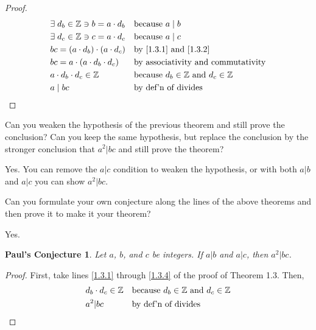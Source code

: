 \documentclass[../main.tex]{subfiles}
\begin{document}
\begin{proof}
\begin{align}
    \label{1.3.1}
    &\exists \; d_b \in \mathbb{Z} \ni b = a \cdot d_b && \mbox{because } a \mid b \\
    \label{1.3.2}
    &\exists \; d_c \in \mathbb{Z} \ni c = a \cdot d_c && \mbox{because } a \mid c \\
    &bc = (a \cdot d_b) \cdot (a \cdot d_c) && \mbox{by \eqref{1.3.1} and \eqref{1.3.2}} \\
    \label{1.3.4}
    &bc = a \cdot (a \cdot d_b \cdot d_c) && \mbox{by associativity and commutativity} \\
    &a \cdot d_b \cdot d_c \in \mathbb{Z} && \mbox{because } d_b \in \mathbb{Z} \mbox{ and } d_c \in \mathbb{Z} \\
    &a \mid bc && \mbox{by def'n of divides} \qedhere
\end{align}
\end{proof}



\begin{ques} \label{1.4}
    Can you weaken the hypothesis of the previous theorem and still prove the conclusion? Can you keep the same hypothesis, but replace the conclusion by the stronger conclusion that $a^2 | bc$ and still prove the theorem?
\end{ques}

Yes. You can remove the $a | c$ condition to weaken the hypothesis, or with both $a | b$ and $a | c$ you can show $a^2 | bc$.



\pagebreak



\begin{ques} \label{1.5}
Can you formulate your own conjecture along the lines of the above theorems and then prove it to make it your theorem?
\end{ques}

Yes.
\newtheorem*{PC}{Paul's Conjecture}
\begin{PC}
Let $a$, $b$, and $c$ be integers. If $a|b$ and $a|c$, then $a^2|bc$.
\end{PC}

\begin{proof}
First, take lines \eqref{1.3.1} through \eqref{1.3.4} of the proof of Theorem 1.3. Then,
\begin{align*}
    &d_b \cdot d_c \in \mathbb{Z} && \mbox{because } d_b \in \mathbb{Z} \mbox{ and } d_c \in \mathbb{Z} \\
    &a^2|bc && \mbox{by def'n of divides} \qedhere
\end{align*}
\end{proof}
\end{document}
